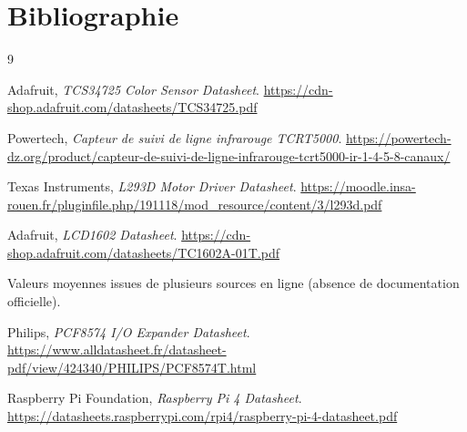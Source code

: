 \documentclass[11pt,a4paper]{article}
\begin{document}
\section{Bibliographie}
\begin{thebibliography}{9}

Adafruit, \textit{TCS34725 Color Sensor Datasheet}.  
\url{https://cdn-shop.adafruit.com/datasheets/TCS34725.pdf}

Powertech, \textit{Capteur de suivi de ligne infrarouge TCRT5000}.  
\url{https://powertech-dz.org/product/capteur-de-suivi-de-ligne-infrarouge-tcrt5000-ir-1-4-5-8-canaux/}

Texas Instruments, \textit{L293D Motor Driver Datasheet}.  
\url{https://moodle.insa-rouen.fr/pluginfile.php/191118/mod_resource/content/3/l293d.pdf}

Adafruit, \textit{LCD1602 Datasheet}.  
\url{https://cdn-shop.adafruit.com/datasheets/TC1602A-01T.pdf}

Valeurs moyennes issues de plusieurs sources en ligne (absence de documentation officielle).

Philips, \textit{PCF8574 I/O Expander Datasheet}.  
\url{https://www.alldatasheet.fr/datasheet-pdf/view/424340/PHILIPS/PCF8574T.html}

Raspberry Pi Foundation, \textit{Raspberry Pi 4 Datasheet}.  
\url{https://datasheets.raspberrypi.com/rpi4/raspberry-pi-4-datasheet.pdf}

\end{thebibliography}
\end{document}
